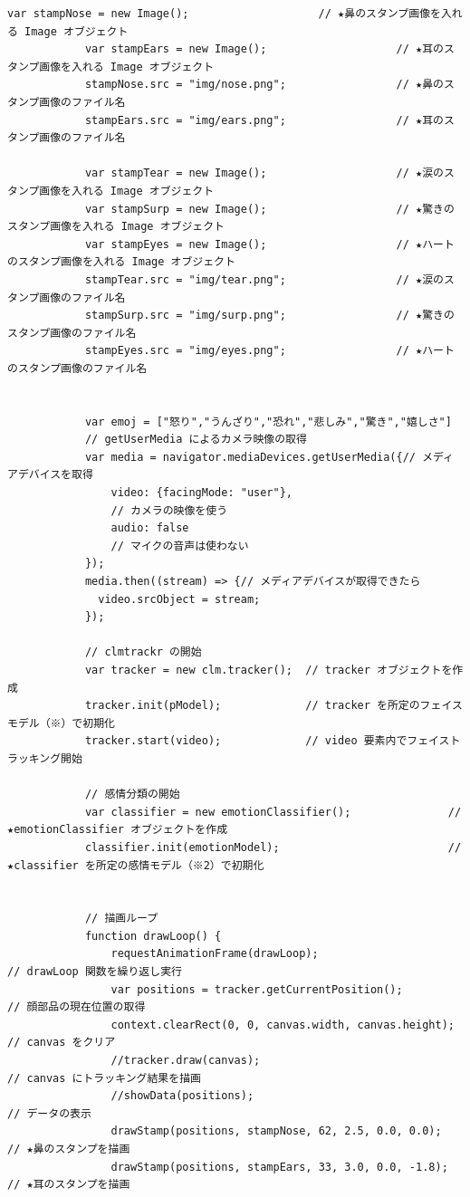 \documentclass[mingoth,11pt,a4j,uplatex]{jsarticle}
\begin{document}
\begin{lstlisting}[caption=.07-06html]
            var stampNose = new Image();                    // ★鼻のスタンプ画像を入れる Image オブジェクト
            var stampEars = new Image();                    // ★耳のスタンプ画像を入れる Image オブジェクト
            stampNose.src = "img/nose.png";                 // ★鼻のスタンプ画像のファイル名
            stampEars.src = "img/ears.png";                 // ★耳のスタンプ画像のファイル名

            var stampTear = new Image();                    // ★涙のスタンプ画像を入れる Image オブジェクト
            var stampSurp = new Image();                    // ★驚きのスタンプ画像を入れる Image オブジェクト
            var stampEyes = new Image();                    // ★ハートのスタンプ画像を入れる Image オブジェクト
            stampTear.src = "img/tear.png";                 // ★涙のスタンプ画像のファイル名
            stampSurp.src = "img/surp.png";                 // ★驚きのスタンプ画像のファイル名
            stampEyes.src = "img/eyes.png";                 // ★ハートのスタンプ画像のファイル名
            
            
            var emoj = ["怒り","うんざり","恐れ","悲しみ","驚き","嬉しさ"]
            // getUserMedia によるカメラ映像の取得
            var media = navigator.mediaDevices.getUserMedia({// メディアデバイスを取得
                video: {facingMode: "user"},                          
                // カメラの映像を使う
                audio: false                                          
                // マイクの音声は使わない
            });
            media.then((stream) => {// メディアデバイスが取得できたら
              video.srcObject = stream;
            });
            
            // clmtrackr の開始
            var tracker = new clm.tracker();  // tracker オブジェクトを作成
            tracker.init(pModel);             // tracker を所定のフェイスモデル（※）で初期化
            tracker.start(video);             // video 要素内でフェイストラッキング開始

            // 感情分類の開始
            var classifier = new emotionClassifier();               // ★emotionClassifier オブジェクトを作成
            classifier.init(emotionModel);                          // ★classifier を所定の感情モデル（※2）で初期化

            
            // 描画ループ
            function drawLoop() {
                requestAnimationFrame(drawLoop);                      // drawLoop 関数を繰り返し実行
                var positions = tracker.getCurrentPosition();         // 顔部品の現在位置の取得
                context.clearRect(0, 0, canvas.width, canvas.height); // canvas をクリア
                //tracker.draw(canvas);                                 // canvas にトラッキング結果を描画
                //showData(positions);                                  // データの表示
                drawStamp(positions, stampNose, 62, 2.5, 0.0, 0.0);   // ★鼻のスタンプを描画
                drawStamp(positions, stampEars, 33, 3.0, 0.0, -1.8);  // ★耳のスタンプを描画


\end{lstlisting}
\end{document}
